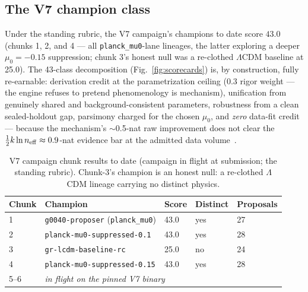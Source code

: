 \documentclass[journal]{IEEEtran}
\begin{document}
\subsection{The V7 champion class}
Under the standing rubric, the V7 campaign's champions to date score $43.0$
(chunks 1, 2, and 4 --- all \texttt{planck\_mu0}-lane lineages, the latter exploring a
deeper $\mu_0=-0.15$ suppression; chunk 3's honest null was a re-clothed $\Lambda$CDM
baseline at 25.0). The 43-class decomposition
(Fig.~\ref{fig:scorecards}) is, by construction, fully re-earnable: derivation credit at
the parametrization ceiling ($0.3$ rigor weight --- the engine refuses to pretend
phenomenology is mechanism), unification from genuinely shared and
background-consistent parameters, robustness from a clean sealed-holdout gap, parsimony
charged for the chosen $\mu_0$, and \emph{zero} data-fit credit --- because the
mechanism's $\sim$0.5-nat raw improvement does not clear the
$\tfrac{1}{2}k\ln n_{\rm eff} \approx 0.9$-nat evidence bar at the admitted data
volume~\cite{schwarz1978,kassraftery1995}.

\begin{table}[t]
\caption{V7 campaign chunk results to date (campaign in flight at submission; the
standing rubric). Chunk-3's champion is an honest null: a re-clothed $\Lambda$CDM
lineage carrying no distinct physics.}
\label{tab:v7}
\centering\footnotesize
\begin{tabular}{@{}lllll@{}}
\toprule
\textbf{Chunk} & \textbf{Champion} & \textbf{Score} & \textbf{Distinct} &
\textbf{Proposals} \\
\midrule
1 & \texttt{g0040-proposer} (\texttt{planck\_mu0}) & 43.0 & yes & 27 \\
2 & \texttt{planck-mu0-suppressed-0.1} & 43.0 & yes & 28 \\
3 & \texttt{gr-lcdm-baseline-rc} & 25.0 & no & 24 \\
4 & \texttt{planck-mu0-suppressed-0.15} & 43.0 & yes & 28 \\
5--6 & \multicolumn{4}{l}{\emph{in flight on the pinned V7 binary}} \\
\bottomrule
\end{tabular}
\end{table}
\end{document}
